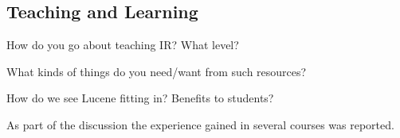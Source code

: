 \subsection{Teaching and Learning}
\label{sec:teaching}


\noindent {}

\noindent {}

\noindent {}


How do you go about teaching IR? What level?

What kinds of things do you need/want from such resources?

How do we see Lucene fitting in? Benefits to students?

\noindent {}

As part of the discussion the experience gained in several courses was reported.

